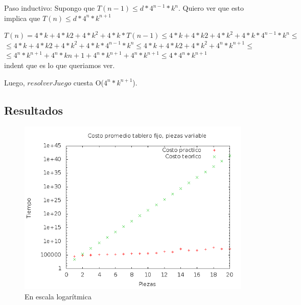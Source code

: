 \indent Paso inductivo: Supongo  que $T(n-1) \leq  d * 4^{n-1}* k^{n}$. Quiero ver que esto implica que  $T(n) \leq  d * 4^{n}* k^{n+1}$\\

\begin{center}

\indent $T(n)= 4*k + 4*k{2} + 4*k^{2} + 4*k * T(n-1) \leq 4*k + 4*k{2} + 4*k^{2} + 4*k * 4^{n-1}* k^{n} \leq $\\
\indent $\leq 4*k + 4*k{2} + 4*k^{2} + 4*k * 4^{n-1}* k^{n} \leq 4*k + 4*k{2} + 4*k^{2} + 4^{n}* k^{n+1} \leq $ \\
\indent $\leq 4^{n}*k^{n+1} + 4^{n}*k{n+1} + 4^{n}*k^{n+1} + 4^{n}* k^{n+1} \leq 4* 4^{n}* k^{n+1}$\\
indent que es lo que queriamos ver.\\
\end{center}


\indent Luego, $resolverJuego$ cuesta O($4^{n}*k^{n+1}$).\\

\subsection{Resultados}

\begin{figure}[H]
	\centering
	\includegraphics[scale=0.6]{ej4-grafico1.png}
	\caption{ En escala logar\'itmica}
\end{figure}

